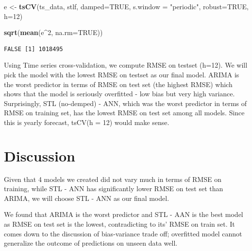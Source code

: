 \documentclass[openany]{book}
\newenvironment{Shaded}{\begin{snugshade}}{\end{snugshade}}
\newcommand{\KeywordTok}[1]{\textcolor[rgb]{0.13,0.29,0.53}{\textbf{#1}}}
\newcommand{\DataTypeTok}[1]{\textcolor[rgb]{0.13,0.29,0.53}{#1}}
\newcommand{\DecValTok}[1]{\textcolor[rgb]{0.00,0.00,0.81}{#1}}
\newcommand{\StringTok}[1]{\textcolor[rgb]{0.31,0.60,0.02}{#1}}
\newcommand{\OtherTok}[1]{\textcolor[rgb]{0.56,0.35,0.01}{#1}}
\newcommand{\OperatorTok}[1]{\textcolor[rgb]{0.81,0.36,0.00}{\textbf{#1}}}
\newcommand{\NormalTok}[1]{#1}
\begin{document}
\begin{Shaded}
\begin{Highlighting}[]
\NormalTok{e <-}\StringTok{ }\KeywordTok{tsCV}\NormalTok{(ts_data, stlf, }\DataTypeTok{damped=}\OtherTok{TRUE}\NormalTok{, }\DataTypeTok{s.window =} \StringTok{"periodic"}\NormalTok{, }\DataTypeTok{robust=}\OtherTok{TRUE}\NormalTok{, }\DataTypeTok{h=}\DecValTok{12}\NormalTok{)}

\KeywordTok{sqrt}\NormalTok{(}\KeywordTok{mean}\NormalTok{(e}\OperatorTok{^}\DecValTok{2}\NormalTok{, }\DataTypeTok{na.rm=}\OtherTok{TRUE}\NormalTok{))}
\end{Highlighting}
\end{Shaded}

\begin{verbatim}
FALSE [1] 1018495
\end{verbatim}

Using Time series cross-validation, we compute RMSE on testset (h=12).
We will pick the model with the lowest RMSE on testset as our final
model. ARIMA is the worst predictor in terms of RMSE on test set (the
highest RMSE) which shows that the model is seriously overfitted - low
bias but very high variance. Surprisingly, STL (no-demped) - ANN, which
was the worst predictor in terms of RMSE on training set, has the lowest
RMSE on test set among all models. Since this is yearly forecast, tsCV(h
= 12) would make sense.

\section*{Discussion}\label{b-discussion}

Given that 4 models we created did not vary much in terms of RMSE on
training, while STL - ANN has significantly lower RMSE on test set than
ARIMA, we will choose STL - ANN as our final model.

We found that ARIMA is the worst predictor and STL - AAN is the best
model as RMSE on test set is the lowest, contradicting to its' RMSE on
train set. It comes down to the discussion of bias-variance trade off;
overfitted model cannot generalize the outcome of predictions on unseen
data well.
\end{document}
